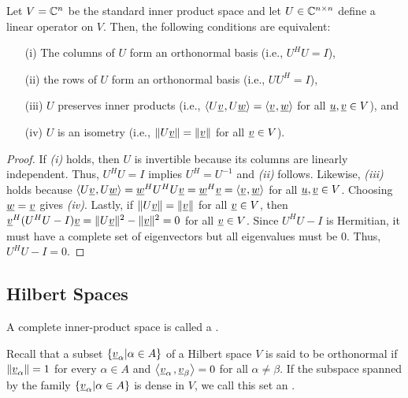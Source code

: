 \begin{theorem}
Let $V = \mathbb{C}^n$ be the standard inner product space and let  $U\in \mathbb{C}^{n\times n}$ define a linear operator on $V$.
Then, the following conditions are equivalent:
\begin{enumerate}
\item[(i)] The columns of $U$ form an orthonormal basis (i.e.,  $U^H U = I$),
\item[(ii)] the rows of $U$ form an orthonormal basis (i.e.,  $U U^H = I$),
\item[(iii)] $U$ preserves inner products (i.e., ${\langle  U \underline{v}  \mskip1mu ,  U \underline{w}  \rangle} = {\langle  \underline{v}  \mskip1mu ,  \underline{w}  \rangle}$ for all $\underline{u},\underline{v}\in V$), and
\item[(iv)] $U$ is an isometry (i.e., $\| U \underline{v} \| = \| \underline{v}\|$ for all $\underline{v} \in V$).
\end{enumerate}
\end{theorem}
\begin{proof}
If {\it(i)} holds, then $U$ is invertible because its columns are linearly independent.
Thus, $U^H U = I$ implies $U^H = U^{-1}$ and {\it(ii)} follows.
Likewise, {\it(iii)} holds because ${\langle  U \underline{v}  \mskip1mu ,  U \underline{w}  \rangle} = \underline{w}^H U^H U \underline{v} = \underline{w}^H \underline{v} = {\langle  \underline{v}  \mskip1mu ,  \underline{w}  \rangle}$ for all $\underline{u},\underline{v}\in V$.
Choosing $\underline{w}=\underline{v}$ gives {\it(iv)}.
Lastly, if $\| U \underline{v} \| = \| \underline{v}\|$ for all $\underline{v} \in V$, then
$\underline{v}^H (U^H U - I) \underline{v} = \| U \underline{v} \|^2 - \| \underline{v} \|^2 = 0$ for all $\underline{v} \in V$.
Since $U^H U - I$ is Hermitian, it must have a complete set of eigenvectors but all eigenvalues must be 0.  Thus, $U^H U - I = 0$.
\end{proof}

\subsection{Hilbert Spaces}

\begin{definition}
A complete inner-product space is called a .
\end{definition}

\begin{definition}
Recall that a subset $\left\{ \underline{v}_{\alpha} | \alpha \in A \right\}$ of a Hilbert space $V$ is said to be orthonormal if $\left\| \underline{v}_{\alpha} \right\| = 1$ for every $\alpha \in A$ and ${\left\langle  \underline{v}_{\alpha}  \mskip2mu ,  \underline{v}_{\beta}  \right\rangle} = 0$ for all $\alpha \neq \beta$.
If the subspace spanned by the family $\left\{ \underline{v}_{\alpha} | \alpha \in A \right\}$ is dense in $V$, we call this set an .
\end{definition}

